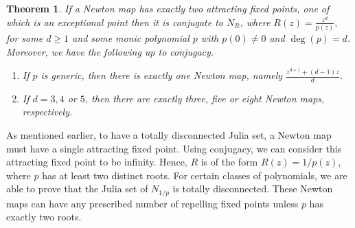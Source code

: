 \documentclass[12pt]{article}
\newtheorem{maintheorem}{Theorem}
\numberwithin{equation}{section}
\begin{document}
\begin{maintheorem}
If a Newton map has exactly two attracting fixed points, one of which is an exceptional point then it is  conjugate to $N_R$, where  $R(z)=\frac{z^d}{p(z)},$ for some $d \geq 1$ and some monic polynomial $p$   with  $p(0) \neq 0$ and $\operatorname{deg}(p)=d$. Moreover, we have the following up to conjugacy.
	\begin{enumerate}
		\item If $p$ is generic, then there is exactly one Newton map, namely  $\frac{z^{d+1} +(d-1)z}{d}$.
		\item If $d=3,4$ or $5$, then there are exactly three, five or eight Newton maps, respectively.
  \end{enumerate}
	\label{two-attracting-fixedponts}
\end{maintheorem}
As mentioned earlier, to have a totally disconnected Julia set, a Newton map must have a single attracting fixed point. Using conjugacy, we can consider this attracting fixed point to be  infinity. Hence, $R$ is of the form $R(z)=1/p(z)$, where $p$ has at least two distinct roots. For certain classes of polynomials, we are able to prove that the Julia set of $N_{1/p}$ is totally disconnected. These Newton maps can have any prescribed number of repelling fixed points unless $p$ has exactly two roots. 
\end{document}

